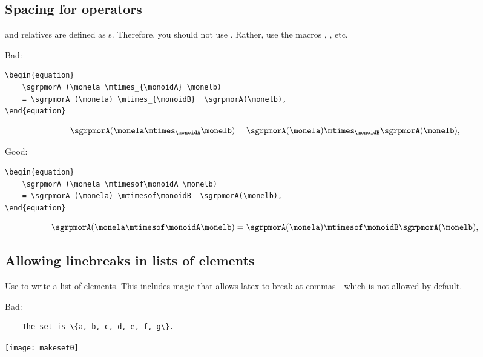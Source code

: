 \subsection{Spacing for operators}

 and relatives are defined as s.
Therefore, you should not use .
Rather, use the macros , , etc.

Bad:

\begin{verbatim}
\begin{equation}
    \sgrpmorA (\monela \mtimes_{\monoidA} \monelb)
    = \sgrpmorA (\monela) \mtimes_{\monoidB}  \sgrpmorA(\monelb),
\end{equation}
\end{verbatim}

\begin{equation}
	\sgrpmorA (\monela \mtimes_{\monoidA} \monelb) = \sgrpmorA (\monela) \mtimes_{\monoidB}  \sgrpmorA(\monelb),
\end{equation}

Good:

\begin{verbatim}
\begin{equation}
    \sgrpmorA (\monela \mtimesof\monoidA \monelb)
    = \sgrpmorA (\monela) \mtimesof\monoidB  \sgrpmorA(\monelb),
\end{equation}
\end{verbatim}

\begin{equation}
	\sgrpmorA (\monela \mtimesof\monoidA \monelb) = \sgrpmorA (\monela) \mtimesof\monoidB  \sgrpmorA(\monelb),
\end{equation}

\subsection{Allowing linebreaks in lists of elements}

Use \str{\makeset} to write a list of elements.
This includes magic that allows latex to break at commas - which is not allowed by default.

Bad:

\begin{verbatim}
    The set is \{a, b, c, d, e, f, g\}.
\end{verbatim}
\begin{widepar}
	\centering
	\texttt{[image: makeset0]}
\end{widepar}

